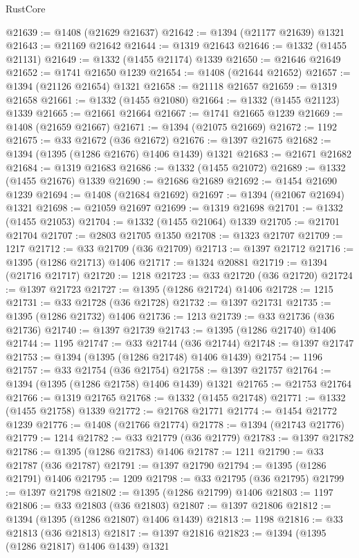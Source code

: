 \begin{lexlean}{RustCore}
\begin{coremodule}
@21639 := @1408 (@21629 @21637)
@21642 := @1394 (@21177 @21639) @1321
@21643 := @21169 @21642
@21644 := @1319 @21643
@21646 := @1332 (@1455 @21131)
@21649 := @1332 (@1455 @21174) @1339
@21650 := @21646 @21649
@21652 := @1741 @21650 @1239
@21654 := @1408 (@21644 @21652)
@21657 := @1394 (@21126 @21654) @1321
@21658 := @21118 @21657
@21659 := @1319 @21658
@21661 := @1332 (@1455 @21080)
@21664 := @1332 (@1455 @21123) @1339
@21665 := @21661 @21664
@21667 := @1741 @21665 @1239
@21669 := @1408 (@21659 @21667)
@21671 := @1394 (@21075 @21669)
@21672 := 1192
@21675 := @33 @21672 (@36 @21672)
@21676 := @1397 @21675
@21682 := @1394 (@1395 (@1286 @21676) @1406 @1439) @1321
@21683 := @21671 @21682
@21684 := @1319 @21683
@21686 := @1332 (@1455 @21072)
@21689 := @1332 (@1455 @21676) @1339
@21690 := @21686 @21689
@21692 := @1454 @21690 @1239
@21694 := @1408 (@21684 @21692)
@21697 := @1394 (@21067 @21694) @1321
@21698 := @21059 @21697
@21699 := @1319 @21698
@21701 := @1332 (@1455 @21053)
@21704 := @1332 (@1455 @21064) @1339
@21705 := @21701 @21704
@21707 := @2803 @21705 @1350
@21708 := @1323 @21707
@21709 := 1217
@21712 := @33 @21709 (@36 @21709)
@21713 := @1397 @21712
@21716 := @1395 (@1286 @21713) @1406
@21717 := @1324 @20881
@21719 := @1394 (@21716 @21717)
@21720 := 1218
@21723 := @33 @21720 (@36 @21720)
@21724 := @1397 @21723
@21727 := @1395 (@1286 @21724) @1406
@21728 := 1215
@21731 := @33 @21728 (@36 @21728)
@21732 := @1397 @21731
@21735 := @1395 (@1286 @21732) @1406
@21736 := 1213
@21739 := @33 @21736 (@36 @21736)
@21740 := @1397 @21739
@21743 := @1395 (@1286 @21740) @1406
@21744 := 1195
@21747 := @33 @21744 (@36 @21744)
@21748 := @1397 @21747
@21753 := @1394 (@1395 (@1286 @21748) @1406 @1439)
@21754 := 1196
@21757 := @33 @21754 (@36 @21754)
@21758 := @1397 @21757
@21764 := @1394 (@1395 (@1286 @21758) @1406 @1439) @1321
@21765 := @21753 @21764
@21766 := @1319 @21765
@21768 := @1332 (@1455 @21748)
@21771 := @1332 (@1455 @21758) @1339
@21772 := @21768 @21771
@21774 := @1454 @21772 @1239
@21776 := @1408 (@21766 @21774)
@21778 := @1394 (@21743 @21776)
@21779 := 1214
@21782 := @33 @21779 (@36 @21779)
@21783 := @1397 @21782
@21786 := @1395 (@1286 @21783) @1406
@21787 := 1211
@21790 := @33 @21787 (@36 @21787)
@21791 := @1397 @21790
@21794 := @1395 (@1286 @21791) @1406
@21795 := 1209
@21798 := @33 @21795 (@36 @21795)
@21799 := @1397 @21798
@21802 := @1395 (@1286 @21799) @1406
@21803 := 1197
@21806 := @33 @21803 (@36 @21803)
@21807 := @1397 @21806
@21812 := @1394 (@1395 (@1286 @21807) @1406 @1439)
@21813 := 1198
@21816 := @33 @21813 (@36 @21813)
@21817 := @1397 @21816
@21823 := @1394 (@1395 (@1286 @21817) @1406 @1439) @1321

\end{coremodule}
\end{lexlean}
